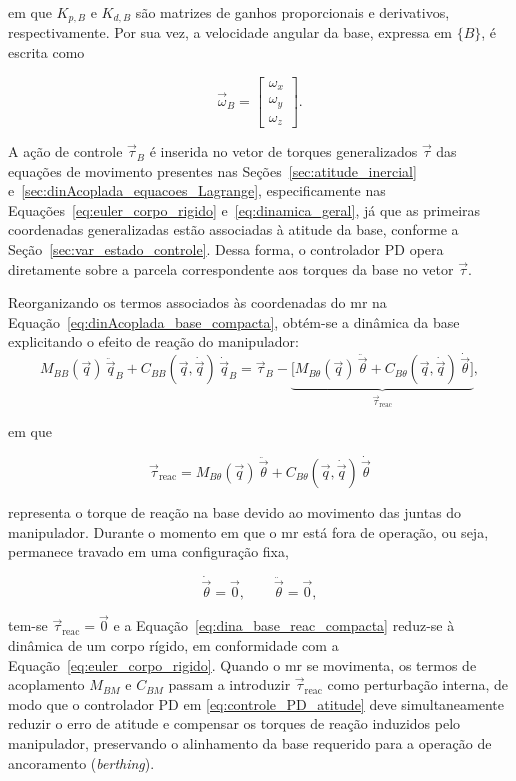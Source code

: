em que \(K_{p,B}\) e \(K_{d,B}\) são matrizes de ganhos proporcionais e derivativos, respectivamente.
Por sua vez, a velocidade angular da base, expressa em $\{B\}$, é escrita como

\begin{equation}
\vec\omega_B =
\begin{bmatrix}
\omega_x \\
\omega_y \\
\omega_z
\end{bmatrix}.
\end{equation}

A ação de controle $\vec\tau_B$ é inserida no vetor de torques generalizados $\vec\tau$ das equações de movimento presentes nas Seções~\ref{sec:atitude_inercial} e~\ref{sec:dinAcoplada_equacoes_Lagrange}, especificamente nas Equações~\eqref{eq:euler_corpo_rigido} e~\eqref{eq:dinamica_geral}, já que as primeiras coordenadas generalizadas estão associadas à atitude da base, conforme a Seção~\ref{sec:var_estado_controle}.
Dessa forma, o controlador PD opera diretamente sobre a parcela correspondente aos torques da base no vetor $\vec\tau$.

Reorganizando os termos associados às coordenadas do \gls{mr} na Equação~\eqref{eq:dinAcoplada_base_compacta}, obtém-se a dinâmica da base explicitando o efeito de reação do manipulador:
\begin{equation}
M_{BB}(\vec q)\,\ddot{\vec q}_B
+
C_{BB}(\vec q,\dot{\vec q})\,\dot{\vec q}_B
=
\vec\tau_B
-
\underbrace{\bigl[
M_{B\theta}(\vec q)\,\ddot{\vec\theta}
+
C_{B\theta}(\vec q,\dot{\vec q})\,\dot{\vec\theta}
\bigr]}_{\displaystyle \vec\tau_{\text{reac}}},
\label{eq:dina_base_reac_compacta}
\end{equation}

em que

\begin{equation}
\vec\tau_{\text{reac}}
=
M_{B\theta}(\vec q)\,\ddot{\vec\theta}
+
C_{B\theta}(\vec q,\dot{\vec q})\,\dot{\vec\theta}
\label{eq:def_tau_reac}
\end{equation}

representa o torque de reação na base devido ao movimento das juntas do manipulador.
Durante o momento em que o \gls{mr} está fora de operação, ou seja, permanece travado em uma configuração fixa,

\begin{equation}
\dot{\vec\theta} = \vec 0,
\qquad
\ddot{\vec\theta} = \vec 0,
\end{equation}

tem-se $\vec\tau_{\text{reac}} = \vec 0$ e a Equação~\eqref{eq:dina_base_reac_compacta} reduz-se à dinâmica de um corpo rígido, em conformidade com a Equação~\eqref{eq:euler_corpo_rigido}.
Quando o \gls{mr} se movimenta, os termos de acoplamento $M_{BM}$ e $C_{BM}$ passam a introduzir $\vec\tau_{\text{reac}}$ como perturbação interna, de modo que o controlador PD em \eqref{eq:controle_PD_atitude} deve simultaneamente reduzir o erro de atitude e compensar os torques de reação induzidos pelo manipulador, preservando o alinhamento da base requerido para a operação de ancoramento (\emph{berthing}).